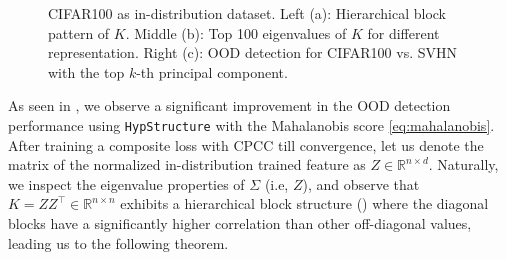 \begin{figure}[ht]
\begin{subfigure}[c]{0.32\textwidth}
        \label{fig:eigenspectrum}
    \end{subfigure}
    \hfill
    \vspace{-10pt}
    \caption{CIFAR100 as in-distribution dataset. Left (a): Hierarchical block pattern of $K$. Middle (b): Top 100 eigenvalues of $K$ for different representation. Right (c): OOD detection for CIFAR100 vs. SVHN with the top $k$-th principal component.}
    \label{fig:three_figures}
\end{figure}


As seen in , we observe a significant improvement in the OOD detection performance using \texttt{HypStructure} with the Mahalanobis score \cref{eq:mahalanobis}. After training a composite loss with CPCC till convergence, let us denote the matrix of the normalized in-distribution trained feature as $Z \in \mathbb{R}^{n \times d}$. Naturally, we inspect the eigenvalue properties of $\Sigma$ (i.e, $Z$), and observe that $K = ZZ^\top \in \mathbb{R}^{n \times n}$ exhibits a hierarchical block structure () where the diagonal blocks have a significantly higher correlation than other off-diagonal values, leading us to the following theorem.  

